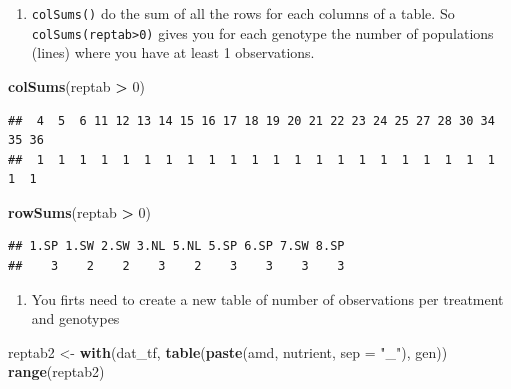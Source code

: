 \documentclass[
  12pt,
]{book}
\newenvironment{Shaded}{\begin{snugshade}}{\end{snugshade}}
\newcommand{\DataTypeTok}[1]{\textcolor[rgb]{0.13,0.29,0.53}{#1}}
\newcommand{\DecValTok}[1]{\textcolor[rgb]{0.00,0.00,0.81}{#1}}
\newcommand{\KeywordTok}[1]{\textcolor[rgb]{0.13,0.29,0.53}{\textbf{#1}}}
\newcommand{\NormalTok}[1]{#1}
\newcommand{\OperatorTok}[1]{\textcolor[rgb]{0.81,0.36,0.00}{\textbf{#1}}}
\newcommand{\StringTok}[1]{\textcolor[rgb]{0.31,0.60,0.02}{#1}}
\providecommand{\tightlist}{%
  \setlength{\itemsep}{0pt}\setlength{\parskip}{0pt}}
\begin{document}
\begin{enumerate}
\def\labelenumi{\arabic{enumi}.}
\setcounter{enumi}{1}
\tightlist
\item
  \texttt{colSums()} do the sum of all the rows for each columns of a table. So \texttt{colSums(reptab\textgreater{}0)} gives you for each genotype the number of populations (lines) where you have at least 1 observations.
\end{enumerate}

\begin{Shaded}
\begin{Highlighting}[]
\KeywordTok{colSums}\NormalTok{(reptab }\OperatorTok{\textgreater{}}\StringTok{ }\DecValTok{0}\NormalTok{)}
\end{Highlighting}
\end{Shaded}

\begin{verbatim}
##  4  5  6 11 12 13 14 15 16 17 18 19 20 21 22 23 24 25 27 28 30 34 35 36 
##  1  1  1  1  1  1  1  1  1  1  1  1  1  1  1  1  1  1  1  1  1  1  1  1
\end{verbatim}

\begin{Shaded}
\begin{Highlighting}[]
\KeywordTok{rowSums}\NormalTok{(reptab }\OperatorTok{\textgreater{}}\StringTok{ }\DecValTok{0}\NormalTok{)}
\end{Highlighting}
\end{Shaded}

\begin{verbatim}
## 1.SP 1.SW 2.SW 3.NL 5.NL 5.SP 6.SP 7.SW 8.SP 
##    3    2    2    3    2    3    3    3    3
\end{verbatim}

\begin{enumerate}
\def\labelenumi{\arabic{enumi}.}
\setcounter{enumi}{2}
\tightlist
\item
  You firts need to create a new table of number of observations per treatment and genotypes
\end{enumerate}

\begin{Shaded}
\begin{Highlighting}[]
\NormalTok{reptab2 \textless{}{-}}\StringTok{ }\KeywordTok{with}\NormalTok{(dat\_tf, }\KeywordTok{table}\NormalTok{(}\KeywordTok{paste}\NormalTok{(amd, nutrient, }\DataTypeTok{sep =} \StringTok{"\_"}\NormalTok{), gen))}
\KeywordTok{range}\NormalTok{(reptab2)}
\end{Highlighting}
\end{Shaded}
\end{document}
